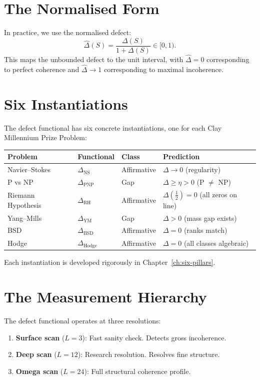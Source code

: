 \documentclass[12pt, openany]{book}
\theoremstyle{remark}
\begin{document}
\section{The Normalised Form}

In practice, we use the normalised defect:
\[
  \hat{\Delta}(S) = \frac{\Delta(S)}{1 + \Delta(S)} \in [0, 1).
\]
This maps the unbounded defect to the unit interval, with $\hat{\Delta} = 0$
corresponding to perfect coherence and $\hat{\Delta} \to 1$ corresponding to
maximal incoherence.

\section{Six Instantiations}

The defect functional has six concrete instantiations, one for each Clay Millennium
Prize Problem:

\begin{center}
\begin{tabular}{llll}
\toprule
\textbf{Problem} & \textbf{Functional} & \textbf{Class} & \textbf{Prediction} \\
\midrule
Navier--Stokes    & $\Delta_{\mathrm{NS}}$    & Affirmative & $\Delta \to 0$ (regularity) \\
P vs NP           & $\Delta_{\mathrm{PNP}}$   & Gap         & $\Delta \geq \eta > 0$ (P $\neq$ NP) \\
Riemann Hypothesis& $\Delta_{\mathrm{RH}}$    & Affirmative & $\Delta(\tfrac{1}{2}) = 0$ (all zeros on line) \\
Yang--Mills       & $\Delta_{\mathrm{YM}}$    & Gap         & $\Delta > 0$ (mass gap exists) \\
BSD               & $\Delta_{\mathrm{BSD}}$   & Affirmative & $\Delta = 0$ (ranks match) \\
Hodge             & $\Delta_{\mathrm{Hodge}}$ & Affirmative & $\Delta = 0$ (all classes algebraic) \\
\bottomrule
\end{tabular}
\end{center}

Each instantiation is developed rigorously in Chapter~\ref{ch:six-pillars}.

\section{The Measurement Hierarchy}

The defect functional operates at three resolutions:
\begin{enumerate}
  \item \textbf{Surface scan} ($L = 3$): Fast sanity check. Detects gross incoherence.
  \item \textbf{Deep scan} ($L = 12$): Research resolution. Resolves fine structure.
  \item \textbf{Omega scan} ($L = 24$): Full structural coherence profile.
\end{enumerate}
\end{document}
